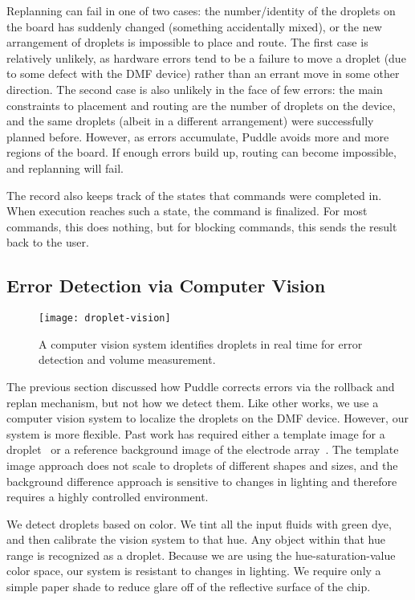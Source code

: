 \documentclass[sigplan, screen]{acmart}
\begin{document}
Replanning can fail in one of two cases: the number/identity of the droplets on the board has suddenly changed (something accidentally mixed), or the new arrangement of droplets is impossible to place and route.
The first case is relatively unlikely, as hardware errors tend to be a failure to move a droplet (due to some defect with the DMF device) rather than an errant move in some other direction.
The second case is also unlikely in the face of few errors: the main constraints to placement and routing are the number of droplets on the device, and the same droplets (albeit in a different arrangement) were successfully planned before.
However, as errors accumulate, Puddle avoids more and more regions of the board.
If enough errors build up, routing can become impossible, and replanning will fail.

The record also keeps track of the states that commands were completed in.
When execution reaches such a state, the command is finalized.
For most commands, this does nothing, but for blocking commands, this sends the result back to the user.

\subsection{Error Detection via Computer Vision}
\label{sec:vision}

\begin{figure}
  \centering
  \texttt{[image: droplet-vision]}
  \caption{
    A computer vision system identifies droplets in real time for error detection and volume measurement.
  }
  \label{fig:tracking}
\end{figure}

The previous section discussed how Puddle corrects errors via the rollback and replan mechanism, but not how we detect them.
Like other works, we use a computer vision system to localize the droplets on the DMF device.
However, our system is more flexible.
Past work has required either a template image for a droplet~\cite{luo2013error} or a reference background image of the electrode array~\cite{shin2010vision, vo2017image-dmf}.
The template image approach does not scale to droplets of different shapes and sizes, and the background difference approach is sensitive to changes in lighting and therefore requires a highly controlled environment.

We detect droplets based on color.
We tint all the input fluids with green dye, and then calibrate the vision system to that hue.
Any object within that hue range is recognized as a droplet.
Because we are using the hue-saturation-value color space, our system is resistant to changes in lighting.
We require only a simple paper shade to reduce glare off of the reflective surface of the chip.
\end{document}
